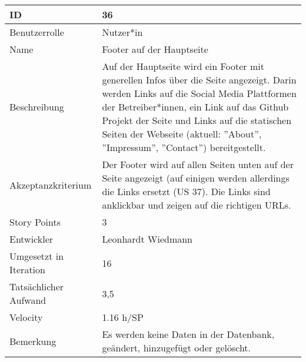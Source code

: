 \begin{tabularx}{\textwidth}{|p{}|X|}
	\hline
	ID & 36\\
	\hline
	Benutzerrolle & Nutzer*in\\
	\hline
	Name & Footer auf der Hauptseite\\
	\hline
	Beschreibung & Auf der Hauptseite wird ein Footer mit generellen Infos über die Seite angezeigt. Darin werden Links auf die Social Media Plattformen der Betreiber*innen, ein Link auf das Github Projekt der Seite und Links auf die statischen Seiten der Webseite (aktuell: ''About'', ''Impressum'', ''Contact'') bereitgestellt.\\
	\hline
	Akzeptanzkriterium & Der Footer wird auf allen Seiten unten auf der Seite angezeigt (auf einigen werden allerdings die Links ersetzt (US 37). Die Links sind anklickbar und zeigen auf die richtigen URLs.\\
	\hline
	Story Points & 3\\
	\hline
	Entwickler & Leonhardt Wiedmann\\
	\hline
	Umgesetzt in Iteration & 16\\
	\hline
	Tatsächlicher Aufwand & 3,5\\
	\hline
	Velocity & 1.16 h/SP\\
	\hline
	Bemerkung & Es werden keine Daten in der Datenbank, geändert, hinzugefügt oder gelöscht.\\
	\hline
\end{tabularx}
\vspace{20pt}
